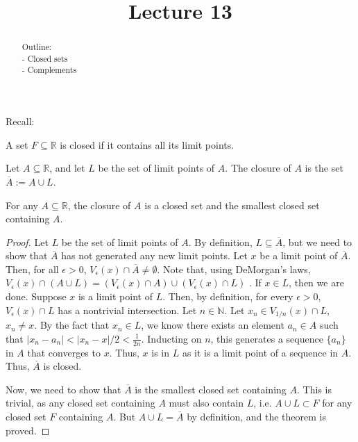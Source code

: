 \documentclass{ximera}
\begin{document}
    \title{Lecture 13}
    
    \begin{abstract}  
    Outline: \\
    - Closed sets \\
    - Complements
\end{abstract}

\maketitle

Recall:

\begin{definition}
    A set $F\subseteq\mathbb{R}$ is closed if it contains all its limit points.
\end{definition}

\begin{definition}
    Let $A\subseteq \mathbb{R}$, and let $L$ be the set of limit points of $A$.  The closure of $A$ is the set $\overline{A}:= A\cup L$.
\end{definition}

\begin{theorem}
    For any $A\subseteq \mathbb{R}$, the closure of $A$ is a closed set and the smallest closed set containing $A$.
\end{theorem}
\begin{proof}
    Let $L$ be the set of limit points of $A$.  By definition, $L \subseteq \overline{A}$, but we need to show that $\overline{A}$ has not generated any new limit points.  Let $x$ be a limit point of $\overline{A}$.  Then, for all $\epsilon > 0$,  $V_\epsilon(x) \cap \overline{A} \neq \emptyset$.  Note that, using DeMorgan's laws, $V_\epsilon(x) \cap (A\cup L) = (V_\epsilon(x) \cap A) \cup (V_\epsilon(x) \cap L)$ .  If $x \in L$, then we are done.  Suppose $x$ is a limit point of $L$.  Then, by definition, for every $\epsilon > 0$, $V_\epsilon(x) \cap L$ has a nontrivial intersection.  Let $n \in \mathbb{N}$. Let $x_{n} \in V_{1/n}(x) \cap L$, $x_{n} \neq x$.  By the fact that $x_n \in L$, we know there exists an element $a_n\in A$ such that $|x_n -a_n| < |x_n - x|/2 < \frac{1}{2n}$.  Inducting on $n$, this generates a sequence $\{a_n\}$ in $A$ that converges to $x$.  Thus, $x$ is in $L$ as it is a limit point of a sequence in $A$.  Thus, $\overline{A}$ is closed.

    Now, we need to show that $\overline{A}$ is the smallest closed set containing $A$.  This is trivial, as any closed set containing $A$ must also contain $L$, i.e. $A\cup L \subset F$ for any closed set $F$ containing $A$.  But $A \cup L = \overline{A}$ by definition, and the theorem is proved.
\end{proof}
\end{document}
